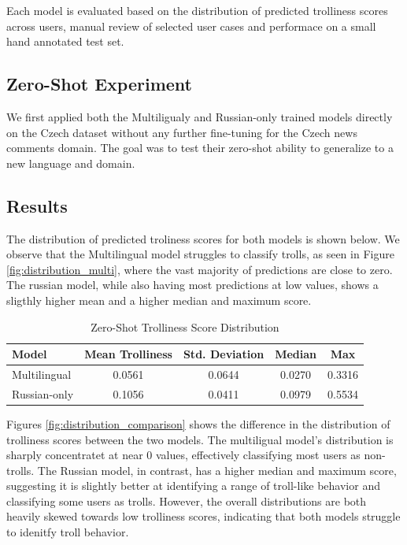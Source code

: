 \documentclass[twoside]{ctuthesis}
\theoremstyle{plain}
\theoremstyle{definition}
\theoremstyle{note}
\begin{document}
Each model is evaluated based on the distribution of predicted trolliness scores across users, manual review of selected user cases and performace on a small hand annotated test set.

\subsection{Zero-Shot Experiment}
We first applied both the Multiligualy and Russian-only trained models directly on the Czech dataset without any further fine-tuning for the Czech news comments domain. The goal was to test their zero-shot ability to generalize to a new language and domain.\par

\subsection{Results}
The distribution of predicted troliness scores for both models is shown below. We observe that the Multilingual model struggles to classify trolls, as seen in Figure \ref{fig:distribution_multi}, where the vast majority of predictions are close to zero. The russian model, while also having most predictions at low values, shows a sligthly higher mean and a higher median and maximum score.

\begin{table}[h]
	\centering
	\begin{tabular}{|l|c|c|c|c|}
	\hline
	Model            & Mean Trolliness & Std. Deviation & Median & Max    \\
	\hline
	Multilingual      & 0.0561          & 0.0644          & 0.0270 & 0.3316 \\
	Russian-only      & 0.1056          & 0.0411          & 0.0979 & 0.5534 \\
	\hline
	\end{tabular}
	\caption{Zero-Shot Trolliness Score Distribution}
	\label{tab:zero_shot_scores}
\end{table}

Figures \ref{fig:distribution_comparison} shows the difference in the distribution of trolliness scores between the two models. The multiligual model's distribution is sharply concentratet at near 0 values, effectively classifying most users as non-trolls. The Russian model, in contrast, has a higher median and maximum score, suggesting it is slightly better at identifying a range of troll-like behavior and classifying some users as trolls. However, the overall distributions are both heavily skewed towards low trolliness scores, indicating that both models struggle to idenitfy troll behavior.\par
\end{document}
